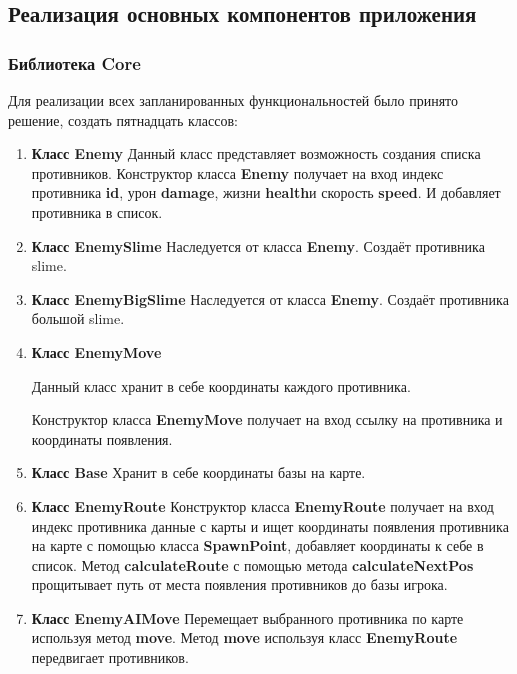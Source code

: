 \subsection{Реализация основных компонентов приложения}

\subsubsection{Библиотека Core}
	
	Для реализации всех запланированных функциональностей было принято решение, создать пятнадцать классов:
	
	\begin{enumerate}
		
	\item \textbf{Класс Enemy}
	Данный класс представляет возможность создания списка противников. Конструктор класса \textbf{Enemy} получает на вход индекс противника \textbf{id}, урон \textbf{damage}, жизни \textbf{health}и скорость \textbf{speed}. И добавляет противника в список.
	
	\item \textbf{Класс EnemySlime}
	Наследуется от класса \textbf{Enemy}. Создаёт противника slime.
	
	\item \textbf{Класс EnemyBigSlime}
	Наследуется от класса \textbf{Enemy}. Создаёт противника большой slime.	
	
	\item \textbf{Класс EnemyMove} 
	
	Данный класс хранит в себе координаты каждого противника. 
	
	Конструктор класса \textbf{EnemyMove} получает на вход ссылку на противника и координаты появления.
	
	\item \textbf{Класс Base}
	Хранит в себе координаты базы на карте.
	
	\item \textbf{Класс EnemyRoute}
	Конструктор класса \textbf{EnemyRoute} получает на вход индекс противника данные с карты и ищет координаты появления противника на карте с помощью класса \textbf{SpawnPoint}, добавляет координаты к себе в список. Метод \textbf{calculateRoute} с помощью метода \textbf{calculateNextPos} прощитывает путь от места появления противников до базы игрока.
	
	 \item \textbf{Класс EnemyAIMove} 
	 Перемещает выбранного противника по карте используя метод \textbf{move}. Метод \textbf{move} используя класс \textbf{EnemyRoute} передвигает противников.
	 

\end{enumerate}
